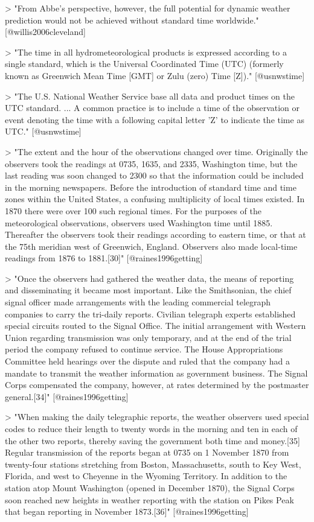 > "From Abbe's perspective, however, the full potential for dynamic weather
prediction would not be achieved without standard time worldwide."
[@willis2006cleveland]

> "The time in all hydrometeorological products is expressed according to 
a single standard, which is the Universal Coordinated Time (UTC) 
(formerly known as Greenwich Mean Time [GMT] or Zulu (zero) Time [Z])."
[@usnwstime]

> "The U.S. National Weather Service base all data and product times on the 
UTC standard. ... A common practice is to include a time of the observation 
or event denoting the time with a following capital letter 'Z' to indicate the 
time as UTC." [@usnwstime]

> "The extent and the hour of the observations changed over time. Originally the
observers took the readings at 0735, 1635, and 2335, Washington time, but the
last reading was soon changed to 2300 so that the information could be included
in the morning newspapers. Before the introduction of standard time and time
zones within the United States, a confusing multiplicity of local times existed.
In 1870 there were over 100 such regional times. For the purposes of the
meteorological observations, observers used Washington time until 1885.
Thereafter the observers took their readings according to eastern time, or that
at the 75th meridian west of Greenwich, England. Observers also made local-time
readings from 1876 to 1881.[30]" [@raines1996getting]

> "Once the observers had gathered the weather data, the means of reporting and
disseminating it became most important. Like the Smithsonian, the chief signal
officer made arrangements with the leading commercial telegraph companies to
carry the tri-daily reports. Civilian telegraph experts established special
circuits routed to the Signal Office. The initial arrangement with Western Union
regarding transmission was only temporary, and at the end of the trial period
the company refused to continue service. The House Appropriations Committee held
hearings over the dispute and ruled that the company had a mandate to transmit
the weather information as government business. The Signal Corps compensated the
company, however, at rates determined by the postmaster general.[34]" [@raines1996getting]

> "When making the daily telegraphic reports, the weather observers used special
codes to reduce their length to twenty words in the morning and ten in each of
the other two reports, thereby saving the government both time and money.[35]
Regular transmission of the reports began at 0735 on 1 November 1870 from
twenty-four stations stretching from Boston, Massachusetts, south to Key West,
Florida, and west to Cheyenne in the Wyoming Territory. In addition to the
station atop Mount Washington (opened in December 1870), the Signal Corps soon
reached new heights in weather reporting with the station on Pikes Peak that
began reporting in November 1873.[36]" [@raines1996getting]

